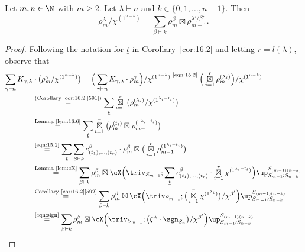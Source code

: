 \begin{theorem}[Theorem B]\label{thm:16.7}
	Let $m,n\in\N$ with $m\ge 2$. Let $\lambda\vdash n$ and $k\in\{0,1,\dotsc,n-1\}$. Then
	\[ \rho^\lambda_m/\chi^{(1^{n-k})} = \sum_{\beta\vdash k} \rho^\beta_m\boxtimes \rho^{\lambda'/\beta'}_{m-1}. \]
\end{theorem}

\begin{proof}
	Following the notation for $\underline{t}$ in Corollary~\ref{cor:16.2} and letting $r=l(\lambda)$, observe that
	\begin{align*}
		\sum_{\gamma\vdash n} K_{\gamma,\lambda} &\cdot \big( \rho^\gamma_m/\chi^{(1^{n-k})} \big) = \Big( \sum_{\gamma\vdash n} K_{\gamma,\lambda}\cdot \rho^\gamma_m \Big)/\chi^{(1^{n-k})} \overset{\normalfont\tiny\text{\eqref{eqn:15.2}}}{=} \Big( \operatorname*{\boxtimes}_{i=1}^r \rho^{(\lambda_i)}_m\Big)/\chi^{(1^{n-k})}\\
		&\overset{\normalfont\tiny\text{(Corollary~\ref{cor:16.2}\ref{591})}}{=} \sum_{\underline{t}} \operatorname*{\boxtimes}_{i=1}^r \big( \rho^{(\lambda_i)}_m/\chi^{(1^{\lambda_i-t_i})} \big)\\
		&\overset{\normalfont\tiny\text{Lemma~\ref{lem:16.6}}}{=} \sum_{\underline{t}} \operatorname*{\boxtimes}_{i=1}^r \big( \rho^{(t_i)}_m \boxtimes \rho^{(1^{\lambda_i-t_i})}_{m-1} \big)\\
		&\overset{\normalfont\tiny\text{\eqref{eqn:15.2}}}{=} \sum_{\underline{t}} \sum_{\beta\vdash k} c^\beta_{(t_1),\dotsc,(t_r)}\cdot\rho^\beta_m \boxtimes \big(\operatorname*{\boxtimes}_{i=1}^r \rho^{(1^{\lambda_i-t_i})}_{m-1}\big)\\
		&\overset{\normalfont\tiny \text{Lemma~\ref{lem:cX}}}{=} \sum_{\beta\vdash k} \rho^\beta_m \boxtimes \cX\Big(\triv_{S_{m-1}}; \sum_{\underline{t}} c^\beta_{(t_1),\dotsc,(t_r)}\cdot \operatorname*{\boxtimes}_{i=1}^r \chi^{(1^{\lambda_i-t_i})} \Big)\up_{S_{m-1}\wr S_{n-k}}^{S_{(m-1)(n-k)}}\\
		&\overset{\normalfont\tiny\text{Corollary~\ref{cor:16.2}\ref{592}}}{=} \sum_{\beta\vdash k} \rho^\beta_m \boxtimes \cX \Big( \triv_{S_{m-1}}; \big( \operatorname*{\boxtimes}_{i=1}^r \chi^{(1^{\lambda_i})}\big) /\chi^{\beta'} \Big) \up_{S_{m-1}\wr S_{n-k}}^{S_{(m-1)(n-k)}}\\
		&\overset{\normalfont\tiny\text{\eqref{eqn:sign}}}{=} \sum_{\beta\vdash k} \rho^\beta_m \boxtimes \cX \Big( \triv_{S_{m-1}}; \big( \zeta^\lambda\cdot\sgn_{S_n} \big) /\chi^{\beta'} \Big) \up_{S_{m-1}\wr S_{n-k}}^{S_{(m-1)(n-k)}}\\

\end{align*}
\end{proof}

